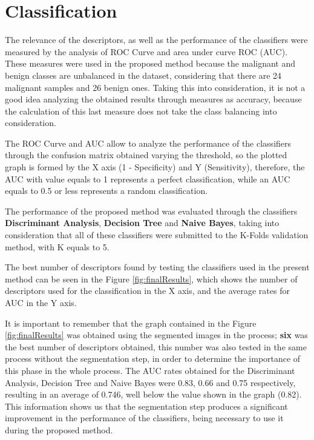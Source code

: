 \documentclass[conference]{IEEEtran}
\begin{document}
	\section{Classification}
        \par The relevance of the descriptors, as well as the performance of the classifiers were measured by the analysis of ROC Curve and area under curve ROC (AUC). These measures were used in the proposed method because the malignant and benign classes are unbalanced in the dataset, considering that there are 24 malignant samples and 26 benign ones. Taking this into consideration, it is not a good idea analyzing the obtained results through measures as accuracy, because the calculation of this last measure does not take the class balancing into consideration.
		\par The ROC Curve and AUC allow to analyze the performance of the classifiers through the confusion matrix obtained varying the threshold, so the plotted graph is formed by the X axis (1 - Specificity) and Y (Sensitivity), therefore, the AUC with value equals to 1 represents a perfect classification, while an AUC equals to 0.5 or less represents a random classification.
		\par The performance of the proposed method was evaluated through the classifiers \textbf{Discriminant Analysis}, \textbf{Decision Tree} and \textbf{Naive Bayes}, taking into consideration that all of these classifiers were submitted to the K-Folds validation method, with K equals to 5.
		\par The best number of descriptors found by testing the classifiers used in the present method can be seen in the Figure \ref{fig:finalResults}, which shows the number of descriptors used for the classification in the X axis, and the average rates for AUC in the Y axis.
		\par It is important to remember that the graph contained in the Figure \ref{fig:finalResults} was obtained using the segmented images in the process; \textbf{six} was the best number of descriptors obtained, this number was also tested in the same process without the segmentation step, in order to determine the importance of this phase in the whole process. The AUC rates obtained for the Discriminant Analysis, Decision Tree and Naive Bayes were 0.83, 0.66 and 0.75 respectively, resulting in an average of 0.746, well below the value shown in the graph (0.82). This information shows us that the segmentation step produces a significant improvement in the performance of the classifiers, being necessary to use it during the proposed method.
\end{document}
